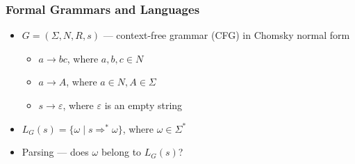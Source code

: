 \documentclass[xcolor=table]{beamer}
\begin{document}
\begin{frame}[fragile] \frametitle{Formal Grammars and Languages}
        \begin{itemize}
        \item $G = (\Sigma, N, R, s)$ --- context-free grammar (CFG) in Chomsky normal form
          \begin{itemize}
            \item $a \rightarrow b c$, where $a, b, c \in N$
            \item $a \rightarrow A$, where $a \in N, A \in \Sigma$
            \item $s \rightarrow \varepsilon$, where $\varepsilon$ is an empty string
          \end{itemize}
        \item $L_G (s) = \{ \omega \mid s \Rightarrow^* \omega \}$, where $\omega \in \Sigma^*$
        \item Parsing --- does $\omega$ belong to $ L_G (s)$?

        \end{itemize}
\end{frame}
\end{document}
